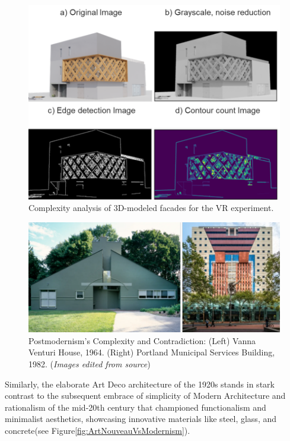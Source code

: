     \begin{figure}[htb]
    \centering
    \includegraphics[width= \linewidth]{Images/CICARenderPlot}
    \caption{Complexity analysis of 3D-modeled facades for the VR experiment.}
    \label{fig:ComplexityPlotRenderCICA}
    \end{figure}

\begin{figure}[htb]
\centering
\includegraphics[width= \linewidth]{Images/PostmodernismVenturi}
\caption{Postmodernism's Complexity and Contradiction: (Left) Vanna Venturi House, 1964. (Right) Portland Municipal Services Building, 1982. (\textit{Images edited from source})}
\label{fig:postmodernfacade}
\end{figure}

Similarly, the elaborate Art Deco architecture of the 1920s stands in stark contrast to the subsequent embrace of simplicity of Modern Architecture and rationalism  of the mid-20th century that championed functionalism and minimalist aesthetics, showcasing innovative materials like steel, glass, and concrete\cite{Stacbond2020}(see Figure\ref{fig:ArtNouveauVsModernism}).



